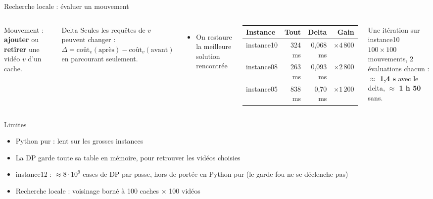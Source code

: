 \documentclass[aspectratio=169,xcolor=table]{pres}
\begin{document}
\begin{frame}{Recherche locale : évaluer un mouvement}
  \begin{columns}[c]
    Mouvement : \textbf{ajouter} ou \textbf{retirer} une vidéo $v$ d'un cache.

    \vspace{0.5em}
    \begin{block}{Delta}
      Seules les requêtes de $v$ peuvent changer :\\[0.3em]
      $\Delta = \text{coût}_v(\text{après}) - \text{coût}_v(\text{avant})$\\[0.3em]
      en parcourant  seulement.
    \end{block}
    \begin{itemize}
      \item On restaure la meilleure solution rencontrée
    \end{itemize}
    \centering
    \small
    \begin{tabular}{lrrr}
      \hline
      \rowcolor{accent!15} \textbf{Instance} & \textbf{Tout} & \textbf{Delta} & \textbf{Gain} \\ \hline
      instance10 & 324 ms & 0,068 ms & $\times 4\,800$ \\
      instance08 & 263 ms & 0,093 ms & $\times 2\,800$ \\
      instance05 & 838 ms & 0,70 ms & $\times 1\,200$ \\ \hline
    \end{tabular}

    \vspace{0.8em}
    \begin{block}{Une itération sur instance10}
      $100 \times 100$ mouvements, 2 évaluations chacun :\\
      \textbf{$\approx$ 1,4 s} avec le delta, \textbf{$\approx$ 1 h 50} sans.
    \end{block}
  \end{columns}
\end{frame}

\begin{frame}{Limites}
  \begin{itemize}
    \item Python pur : lent sur les grosses instances
    \item La DP garde toute sa table en mémoire, pour retrouver les vidéos choisies
    \item instance12 : $\approx 8 \cdot 10^9$ cases de DP par passe, hors de portée en Python pur (le garde-fou ne se déclenche pas)
    \item Recherche locale : voisinage borné à 100 caches $\times$ 100 vidéos
  \end{itemize}
\end{frame}
\end{document}
